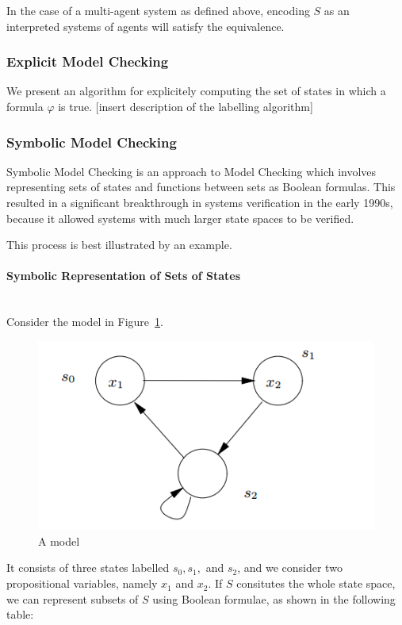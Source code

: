 \documentclass{article}
\newcommand{\myparagraph}[1]{\paragraph{#1}\mbox{}\\}
\begin{document}
In the case of a multi-agent system as defined above, encoding $S$ as an interpreted systems of agents will satisfy the equivalence. 

\subsubsection{Explicit Model Checking}

We present an algorithm for explicitely computing the set of states in which a formula $\varphi$ is true. 
[insert description of the labelling algorithm]

\subsubsection{Symbolic Model Checking}

Symbolic Model Checking is an approach to Model Checking which involves representing sets of states and functions between sets as Boolean formulas. This resulted in a significant breakthrough in systems verification in the early 1990s, because it allowed systems with much larger state spaces to be verified.

This process is best illustrated by an example. 

\myparagraph{Symbolic Representation of Sets of States}

Consider the model in Figure~\ref {fig:model_example}. \cite{logic_in_computer_science}
\begin{figure}
    \centering
    \includegraphics[scale=0.55]{symbolic_model_checking_example.PNG}
    \caption{A model}
    \label{fig:model_example}
\end{figure}
It consists of three states labelled $s_0, s_1,$ and $s_2$, and we consider two propositional variables, namely $x_1$ and $x_2$. 
If $S$ consitutes the whole state space, we can represent subsets of $S$ using Boolean formulae, as shown in the following table:\\
\end{document}

